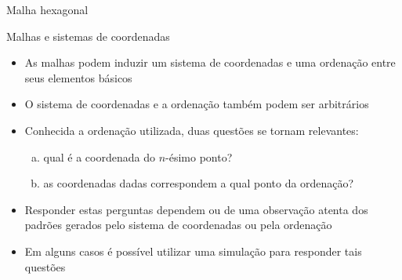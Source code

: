 \begin{frame}[fragile]{Malha hexagonal}
\begin{figure}[h]

    \end{figure}

\end{frame}

\begin{frame}[fragile]{Malhas e sistemas de coordenadas}

    \begin{itemize}
        \item As malhas podem induzir um sistema de coordenadas e uma ordenação entre seus elementos básicos

        \item O sistema de coordenadas e a ordenação também podem ser arbitrários

        \item Conhecida a ordenação utilizada, duas questões se tornam relevantes:

        \begin{enumerate}[(a)]
            \item qual é a coordenada do $n$-ésimo ponto?
            \item as coordenadas dadas correspondem a qual ponto da ordenação?
        \end{enumerate}

        \item Responder estas perguntas dependem ou de uma observação atenta dos padrões gerados pelo sistema de coordenadas ou pela ordenação

        \item Em alguns casos é possível utilizar uma simulação para responder tais questões
    \end{itemize}

\end{frame}

